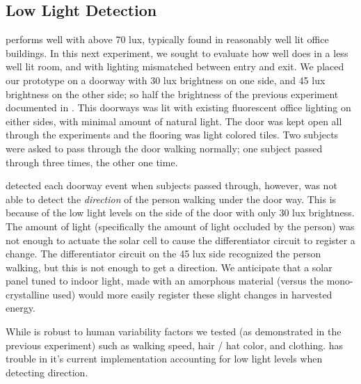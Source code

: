 \subsection{Low Light Detection}
\sysname performs well with above 70 lux, typically found in reasonably well lit office buildings. 
In this next experiment, we sought to evaluate how well \sysname does in a less well lit room, and with lighting mismatched between entry and exit.
We placed our \sysname prototype on a doorway with 30 lux brightness on one side, and 45 lux brightness on the other side; so half the brightness of the previous experiment documented in .
This doorways was lit with existing fluorescent office lighting on either sides, with minimal amount of natural light. 
The door was kept open all through the experiments and the flooring was light colored tiles.
Two subjects were asked to pass through the door walking normally; one subject passed through three times, the other one time.

\sysname detected each doorway event when subjects passed through, however, \sysname was not able to detect the \textit{direction} of the person walking under the door way. 
This is because of the low light levels on the side of the door with only 30 lux brightness.
The amount of light (specifically the amount of light occluded by the person) was not enough to actuate the solar cell to cause the differentiator circuit to register a change.
The differentiator circuit on the 45 lux side recognized the person walking, but this is not enough to get a direction.
We anticipate that a solar panel tuned to indoor light, made with an amorphous material (versus the mono-crystalline used) would more easily register these slight changes in harvested energy.

While \sysname is robust to human variability factors we tested (as demonstrated in the previous experiment) such as walking speed, hair / hat color, and clothing. 
\sysname has trouble in it's current implementation accounting for low light levels when detecting direction.  

